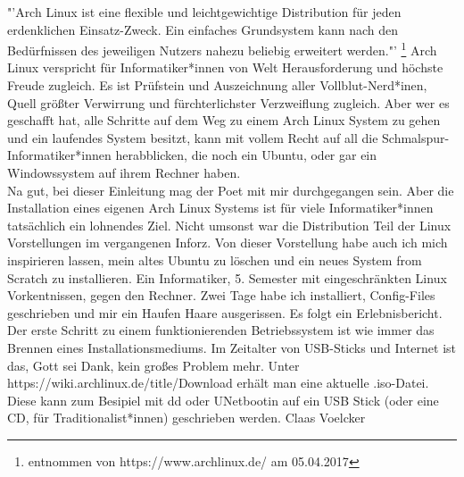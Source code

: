 {"'Arch Linux ist eine flexible und leichtgewichtige Distribution für jeden erdenklichen Einsatz-Zweck. Ein einfaches Grundsystem kann nach den Bedürfnissen des jeweiligen Nutzers nahezu beliebig erweitert werden."' \footnote{entnommen von https://www.archlinux.de/ am 05.04.2017}
}{
Arch Linux verspricht für Informatiker*innen von Welt Herausforderung und höchste Freude zugleich. Es ist Prüfstein und Auszeichnung aller Vollblut-Nerd*inen, Quell größter Verwirrung und fürchterlichster Verzweiflung zugleich. Aber wer es geschafft hat, alle Schritte auf dem Weg zu einem Arch Linux System zu gehen und ein laufendes System besitzt, kann mit vollem Recht auf all die Schmalspur-Informatiker*innen herabblicken, die noch ein Ubuntu, oder gar ein Windowssystem auf ihrem Rechner haben. \\


Na gut, bei dieser Einleitung mag der Poet mit mir durchgegangen sein. Aber die Installation eines eigenen Arch Linux Systems ist für viele Informatiker*innen tatsächlich ein lohnendes Ziel. Nicht umsonst war die Distribution Teil der Linux Vorstellungen im vergangenen Inforz. Von dieser Vorstellung habe auch ich mich inspirieren lassen, mein altes Ubuntu zu löschen und ein neues System from Scratch zu installieren. Ein Informatiker, 5. Semester mit eingeschränkten Linux Vorkentnissen, gegen den Rechner. Zwei Tage habe ich installiert, Config-Files geschrieben und mir ein Haufen Haare ausgerissen. Es folgt ein Erlebnisbericht. \\

Der erste Schritt zu einem funktionierenden Betriebssystem ist wie immer das Brennen eines Installationsmediums. Im Zeitalter von USB-Sticks und Internet ist das, Gott sei Dank, kein großes Problem mehr. Unter https://wiki.archlinux.de/title/Download erhält man eine aktuelle .iso-Datei. Diese kann zum Besipiel mit dd oder UNetbootin auf ein USB Stick (oder eine CD, für Traditionalist*innen) geschrieben werden. 
}
{Claas Voelcker}